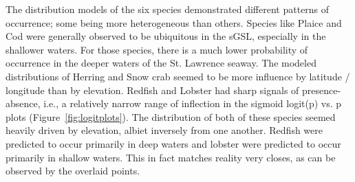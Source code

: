 The distribution models of the six species demonstrated different patterns of occurrence; some being more heterogeneous than others.
Species like Plaice and Cod were generally observed to be ubiquitous in the sGSL, especially in the shallower waters.
For those species, there is a much lower probability of occurrence in the deeper waters of the St. Lawrence seaway.
The modeled distributions of Herring and Snow crab seemed to be more influence by latitude / longitude than by elevation.
Redfish and Lobster had sharp signals of presence-absence, i.e., a relatively narrow range of inflection in the sigmoid
logit(p) vs. p plots (Figure~\ref{fig:logitplots}).
The distribution of both of these species seemed heavily driven by elevation, albiet inversely from one another.
Redfish were predicted to occur primarily in deep waters and lobster were predicted to occur primarily in shallow waters.
This in fact matches reality very closes, as can be observed by the overlaid points.


